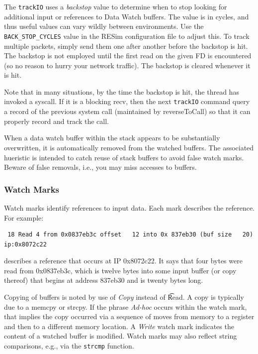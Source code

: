 \documentclass[titlepage]{article}
\begin{document}
The {\tt trackIO} uses a \textit{backstop} value to determine when to stop looking for additional input or references to Data Watch buffers.  The value is in 
cycles, and thus useful values can vary wildly between environments.  Use the {\tt BACK\_STOP\_CYCLES} value in the RESim configuration file to adjust this.
To track multiple packets, simply send them one after another before the backstop is hit.  The backstop is not employed until the first read on the given
FD is encountered (so no reason to hurry your network traffic).  The backstop is cleared whenever it is hit. 

Note that in many situations, by the time the backstop is hit, the thread has invoked a syscall.  If it is a blocking recv, then the next {\tt trackIO} 
command query a record of the previous system call (maintained by reverseToCall) so that it can properly record and track the call.

When a data watch buffer within the stack appears to be substantially overwritten, it is automatically removed from the watched buffers.
The associated hueristic is intended to catch reuse of stack buffers to avoid false watch marks.  Beware of false removals, i.e., you
may miss accesses to buffers.

\subsubsection{Watch Marks}
Watch marks identify references to input data.  Each mark describes the reference.  For example:

\begin{verbatim}
 18 Read 4 from 0x0837eb3c offset   12 into 0x 837eb30 (buf size   20)   ip:0x8072c22
\end{verbatim}
\noindent describes a reference that occurs at IP 0x8072c22.  It says that four bytes were read from 0x0837eb3c, which is twelve bytes into some input buffer
(or copy thereof) that begins at address 837eb30 and is twenty bytes long.

Copying of buffers is noted by use of \textit{Copy} instead of \t{Read}.  A copy is typically due to a memcpy or strcpy.  If the phrase \textit{Ad-hoc} occurs
within the watch mark, that implies the copy occurred via a sequence of moves from memory to a register and then to a different memory location.
A \textit{Write} watch mark indicates the content of a watched buffer is modified.  Watch marks may also reflect string comparisons, e.g., via the {\tt strcmp}
function.
\end{document}
